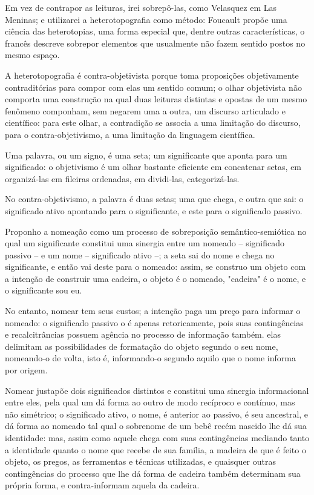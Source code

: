 Em vez de contrapor as leituras, irei sobrepô-las, como Velasquez em Las Meninas;
    e utilizarei a heterotopografia como método:
        Foucault propõe uma ciência das heterotopias, uma forma especial que, dentre outras características, o francês descreve sobrepor elementos que usualmente não fazem sentido postos no mesmo espaço.

A heterotopografia é contra-objetivista porque toma proposições objetivamente contraditórias para compor com elas um sentido comum;
    o olhar objetivista não comporta uma construção na qual duas leituras distintas e opostas de um mesmo fenômeno componham, sem negarem uma a outra, um discurso articulado e científico:
        para este olhar, a contradição se associa a uma limitação do discurso, para o contra-objetivismo, a uma limitação da linguagem científica.
        
Uma palavra, ou um signo, é uma seta;
    um significante que aponta para um significado:
        o objetivismo é um olhar bastante eficiente em concatenar setas, em organizá-las em fileiras ordenadas, em dividi-las, categorizá-las.

No contra-objetivismo, a palavra é duas setas;
    uma que chega, e outra que sai:
        o significado ativo apontando para o significante, e este para o significado passivo.

Proponho a nomeação como um processo de sobreposição semântico-semiótica no qual um significante constitui uma sinergia entre um nomeado -- significado passivo -- e um nome -- significado ativo --;
    a seta sai do nome e chega no significante, e então vai deste para o nomeado:
        assim, se construo um objeto com a intenção de construir uma cadeira, o objeto é o nomeado, "cadeira" é o nome, e o significante sou eu.

No entanto, nomear tem seus custos;
    a intenção paga um preço para informar o nomeado:
        o significado passivo o é apenas retoricamente, pois suas contingências e recalcitrâncias possuem agência no processo de informação também. elas delimitam as possibilidades de formatação do objeto segundo o seu nome, nomeando-o de volta, isto é, informando-o segundo aquilo que o nome informa por origem.

Nomear justapõe dois significados distintos e constitui uma sinergia informacional entre eles, pela qual um dá forma ao outro de modo recíproco e contínuo, mas não simétrico;
    o significado ativo, o nome, é anterior ao passivo, é seu ancestral, e dá forma ao nomeado tal qual o sobrenome de um bebê recém nascido lhe dá sua identidade:
        mas, assim como aquele chega com suas contingências mediando tanto a identidade quanto o nome que recebe de sua família, a madeira de que é feito o objeto, os pregos, as ferramentas e técnicas utilizadas, e quaisquer outras contingências do processo que lhe dá forma de cadeira também determinam sua própria forma, e contra-informam aquela da cadeira.

